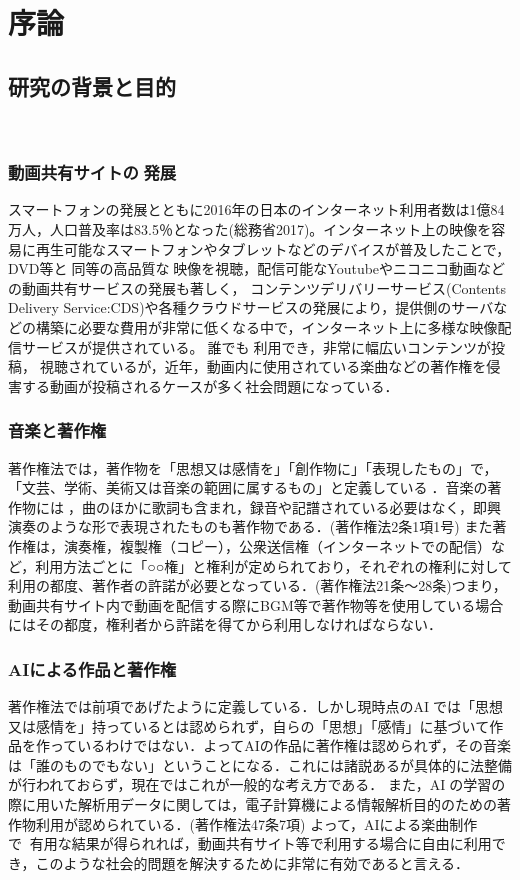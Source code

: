 \chapter{序論}
\section{研究の背景と目的}
%
\subsection{動画共有サイトの発展}
スマートフォンの発展とともに2016年の日本のインターネット利用者数は1億84万人，人口普及率は83.5％となった(総務省2017)。インターネット上の映像を容易に再生可能なスマートフォンやタブレットなどのデバイスが普及したことで，DVD等と同等の高品質な映像を視聴，配信可能なYoutube\cite{webpage}やニコニコ動画\cite{webpage9}などの動画共有サービスの発展も著しく，
コンテンツデリバリーサービス(Contents Delivery Service:CDS)や各種クラウドサービスの発展により，提供側のサーバなどの構築に必要な費用が非常に低くなる中で，インターネット上に多様な映像配信サービスが提供されている。誰でも利用でき，非常に幅広いコンテンツが投稿，視聴されているが，近年，動画内に使用されている楽曲などの著作権を侵害する動画が投稿されるケースが多く社会問題になっている．
\subsection{音楽と著作権}
著作権法では，著作物を「思想又は感情を」「創作物に」「表現したもの」で，「文芸、学術、美術又は音楽の範囲に属するもの」と定義している．音楽の著作物には，曲のほかに歌詞も含まれ，録音や記譜されている必要はなく，即興演奏のような形で表現されたものも著作物である．(著作権法2条1項1号)
また著作権は，演奏権，複製権（コピー），公衆送信権（インターネットでの配信）など，利用方法ごとに「○○権」と権利が定められており，それぞれの権利に対して利用の都度、著作者の許諾が必要となっている．(著作権法21条～28条)つまり，動画共有サイト内で動画を配信する際にBGM等で著作物等を使用している場合にはその都度，権利者から許諾を得てから利用しなければならない．
\newpage
\subsection{AIによる作品と著作権}
著作権法では前項であげたように定義している．しかし現時点のAIでは「思想又は感情を」持っているとは認められず，自らの「思想」「感情」に基づいて作品を作っているわけではない．よってAIの作品に著作権は認められず，その音楽は「誰のものでもない」ということになる．これには諸説あるが具体的に法整備が行われておらず，現在ではこれが一般的な考え方である．
また，AIの学習の際に用いた解析用データに関しては，電子計算機による情報解析目的のための著作物利用が認められている．(著作権法47条7項)
よって，AIによる楽曲制作で有用な結果が得られれば，動画共有サイト等で利用する場合に自由に利用でき，このような社会的問題を解決するために非常に有効であると言える．
